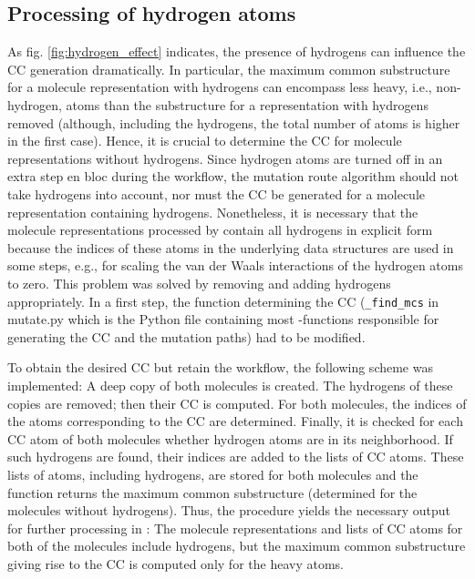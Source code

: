 \subsection{Processing of hydrogen atoms}


As fig. \ref{fig:hydrogen_effect} indicates, the presence of hydrogens can influence the CC generation dramatically. In particular, the maximum common substructure for a molecule representation with hydrogens can encompass less heavy, i.e., non-hydrogen, atoms than the substructure for a representation with hydrogens removed (although, including the hydrogens, the total number of atoms is higher in the first case). Hence, it is crucial to determine the CC for molecule representations without hydrogens. 
Since hydrogen atoms are turned off in an extra step en bloc during the {\trafo} workflow, the mutation route algorithm should not take hydrogens into account, nor must the CC be generated for a molecule representation containing hydrogens.
Nonetheless, it is necessary that the molecule representations processed by \trafo contain all hydrogens in explicit form because the indices of these atoms in the underlying data structures are used in some steps, e.g., for scaling the van der Waals interactions of the hydrogen atoms to zero.
This problem was solved by removing and adding hydrogens appropriately.
In a first step, the {\trafo} function determining the CC (\texttt{\_find\_mcs} in mutate.py which is the Python file containing most {\trafo}-functions responsible for generating the CC and the mutation paths) had to be modified. 

To obtain the desired CC but retain the {\trafo} workflow, the following scheme was implemented:
A deep copy of both molecules is created. The hydrogens of these copies are removed; then their CC is computed. For both molecules, the indices of the atoms corresponding to the CC are determined. Finally, it is checked for each CC atom of both molecules whether hydrogen atoms are in its neighborhood. If such hydrogens are found, their indices are added to the lists of CC atoms. These lists of atoms, including hydrogens, are stored for both molecules and the function returns the maximum common substructure (determined for the molecules without hydrogens).
Thus, the procedure yields the necessary output for further processing in {\trafo}: The molecule representations and lists of CC atoms for both of the molecules include hydrogens, but the maximum common substructure giving rise to the CC is computed only for the heavy atoms.

